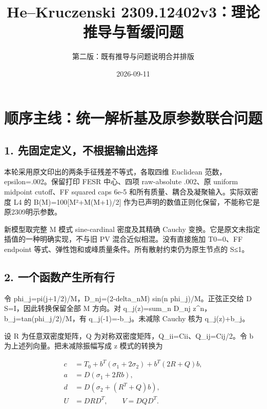 \documentclass[
  11pt,
  a4paper,
]{article}
\title{He--Kruczenski 2309.12402v3：理论推导与暂缓问题}
\subtitle{第二版：既有推导与问题说明合并排版}
\author{}
\date{2026-09-11}
\begin{document}
\maketitle

{
\setcounter{tocdepth}{2}
\tableofcontents
}
\section{顺序主线：统一解析基及原参数联合问题}\label{ux987aux5e8fux4e3bux7ebfux7edfux4e00ux89e3ux6790ux57faux53caux539fux53c2ux6570ux8054ux5408ux95eeux9898}

\subsection{1.
先固定定义，不根据输出选择}\label{ux5148ux56faux5b9aux5b9aux4e49ux4e0dux6839ux636eux8f93ux51faux9009ux62e9}

本轮采用原文印出的两条手征残差不等式，各取四维 Euclidean
范数，epsilon=.002。保留打印 FESR 中心、四项 raw-absolute .002、原
uniform midpoint cutoff、FF squared caps 6e-5
和所有质量、耦合及凝聚输入。实际双密度 L4 的 B(M)=100{[}M²+M(M+1)/2{]}
作为已声明的数值正则化保留，不能称它是原2309明示参数。

新模型取完整 M 模式 sine-cardinal 密度及其精确 Cauchy
变换。它是原文未指定插值的一种明确实现，不与旧 PV
混合近似相混。没有直接施加 T0=0、FF endpoint
等式、弹性饱和或峰质量条件。所有散射约束仍为原生节点的
\textbar S\textbar≤1。

\subsection{2.
一个函数产生所有行}\label{ux4e00ux4e2aux51fdux6570ux4ea7ux751fux6240ux6709ux884c}

令 phi\_j=pi(j+1/2)/M，D\_nj=(2-delta\_nM) sin(n phi\_j)/M。正弦正交给 D
S=I，因此转换保留全部 M 方向。对 q\_j(z)=sum\_n D\_nj
z\^{}n，b\_j=tan(phi\_j/2)/M，有 q\_j(-1)=-b\_j。未减除 Cauchy 核为
q\_j(z)+b\_j。

设 R 为任意双密度矩阵，Q 为对称双密度矩阵，Q\_ii=Cii、Q\_ij=Cij/2。令 b
为上述列向量。把未减除振幅写成 z 模式的转换为

\[
\begin{aligned}
c&=T_0+b^T(\sigma_1+2\sigma_2)+b^T(2R+Q)b,\\
a&=D(\sigma_1+2Rb),\\
d&=D(\sigma_2+(R^T+Q)b),\\
U&=DRD^T,\qquad V=DQD^T.
\end{aligned}
\]
\end{document}
